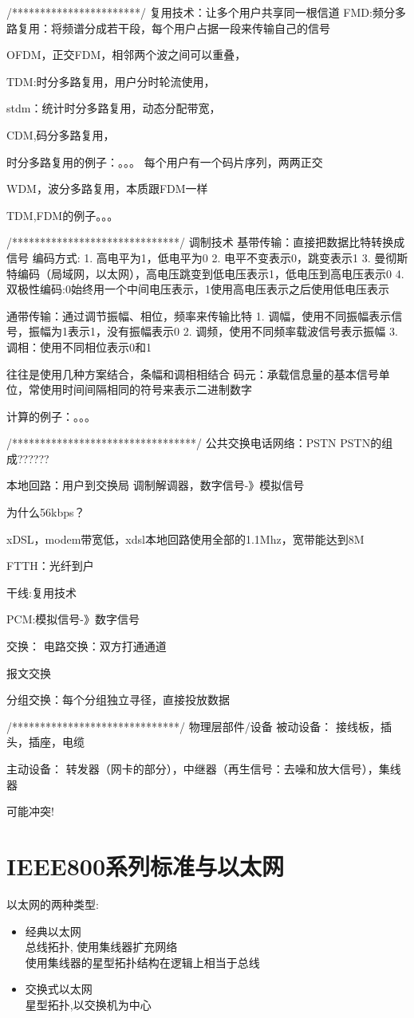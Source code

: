 \documentclass[UTF8,a4paper]{ctexart}
\begin{document}
/***********************/
复用技术：让多个用户共享同一根信道
FMD:频分多路复用：将频谱分成若干段，每个用户占据一段来传输自己的信号

OFDM，正交FDM，相邻两个波之间可以重叠，

TDM:时分多路复用，用户分时轮流使用，

stdm：统计时分多路复用，动态分配带宽，

CDM,码分多路复用，

时分多路复用的例子：。。。
每个用户有一个码片序列，两两正交

WDM，波分多路复用，本质跟FDM一样

TDM,FDM的例子。。。

/******************************/
调制技术
基带传输：直接把数据比特转换成信号
编码方式:
1. 高电平为1，低电平为0
2. 电平不变表示0，跳变表示1
3. 曼彻斯特编码（局域网，以太网），高电压跳变到低电压表示1，低电压到高电压表示0
4. 双极性编码:0始终用一个中间电压表示，1使用高电压表示之后使用低电压表示

通带传输：通过调节振幅、相位，频率来传输比特
1. 调幅，使用不同振幅表示信号，振幅为1表示1，没有振幅表示0
2. 调频，使用不同频率载波信号表示振幅
3. 调相：使用不同相位表示0和1

往往是使用几种方案结合，条幅和调相相结合
码元：承载信息量的基本信号单位，常使用时间间隔相同的符号来表示二进制数字

计算的例子：。。。

/*********************************/
公共交换电话网络：PSTN
PSTN的组成??????

本地回路：用户到交换局
调制解调器，数字信号-》模拟信号

为什么56kbps？

xDSL，modem带宽低，xdsl本地回路使用全部的1.1Mhz，宽带能达到8M

FTTH：光纤到户

干线:复用技术

PCM:模拟信号-》数字信号

交换：
电路交换：双方打通通道

报文交换

分组交换：每个分组独立寻径，直接投放数据

/******************************/
物理层部件/设备
被动设备：
接线板，插头，插座，电缆

主动设备：
转发器（网卡的部分），中继器（再生信号：去噪和放大信号），集线器

可能冲突!

\section{IEEE800系列标准与以太网}
以太网的两种类型:
\begin{itemize}
  \item 经典以太网\\
  总线拓扑, 使用集线器扩充网络\\
  使用集线器的星型拓扑结构在逻辑上相当于总线
  \item 交换式以太网\\
  星型拓扑,以交换机为中心
\end{itemize}
\end{document}
